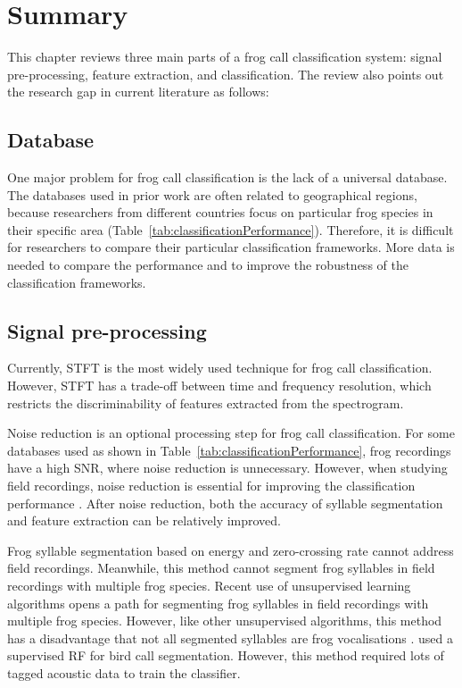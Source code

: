 \section{Summary}
\label{discussion}

This chapter reviews three main parts of a frog call classification system: signal pre-processing, feature extraction, and classification. The review also points out the research gap in current literature as follows:

\subsection{Database}
One major problem for frog call classification is the lack of a universal database. The databases used in prior work are often related to geographical regions, because researchers from different countries focus on particular frog species in their specific area (Table~\ref{tab:classificationPerformance}). Therefore, it is difficult for researchers to compare their particular classification frameworks. More data is needed to compare the performance and to improve the robustness of the classification frameworks.



\subsection{Signal pre-processing}
Currently, STFT is the most widely used technique for frog call classification. However, STFT has a trade-off between time and frequency resolution, which restricts the discriminability of features extracted from the spectrogram. 

Noise reduction is an optional processing step for frog call classification. For some databases used as shown in Table~\ref{tab:classificationPerformance}, frog recordings have a high SNR, where noise reduction is unnecessary. However, when studying field recordings, noise reduction is essential for improving the classification performance \citep{bedoya2014automatic, Huang20141}. After noise reduction, both the accuracy of syllable segmentation and feature extraction can be relatively improved.

Frog syllable segmentation based on energy and zero-crossing rate cannot address field recordings. Meanwhile, this method cannot segment frog syllables in field recordings with multiple frog species. Recent use of unsupervised learning algorithms opens a path for segmenting frog syllables in field recordings with multiple frog species. However, like other unsupervised algorithms, this method has a disadvantage that not all segmented syllables are frog vocalisations \citep{potamitis2015unsupervised}. \citet{briggs2012acoustic} used a supervised RF for bird call segmentation. However, this method required lots of tagged acoustic data to train the classifier.

